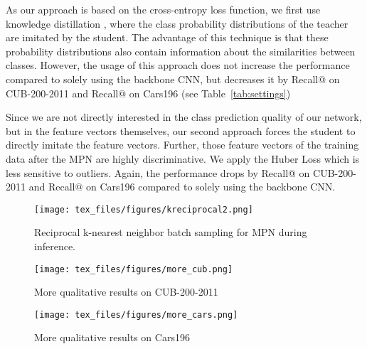 \documentclass{article}
\begin{document}
 As our approach is based on the cross-entropy loss function, we first use knowledge distillation \cite{DBLP:journals/corr/HintonVD15}, where the class probability distributions of the teacher are imitated by the student. The advantage of this technique is that these probability distributions also contain information about the similarities between classes. However, the usage of this approach does not increase the performance compared to solely using the backbone CNN, but decreases it by  Recall@ on CUB-200-2011 and  Recall@ on Cars196 (see Table~\ref{tab:settings})

 Since we are not directly interested in the class prediction quality of our network, but in the feature vectors themselves, our second approach forces the student to directly imitate the feature vectors. Further, those feature vectors of the training data after the MPN are highly discriminative. We apply the Huber Loss which is less sensitive to outliers. Again, the performance drops by  Recall@ on CUB-200-2011 and  Recall@ on Cars196 compared to solely using the backbone CNN.

\begin{figure}[t]
\begin{center}
\centerline{\texttt{[image: tex\_files/figures/kreciprocal2.png]}}
   \caption{Reciprocal k-nearest neighbor batch sampling for MPN during inference.}
   \end{center}
\label{fig:kreciprocal}
\end{figure}

\begin{figure}[ht]
    \begin{center}
    \centerline{\texttt{[image: tex\_files/figures/more\_cub.png]}}
    \caption{More qualitative results on CUB-200-2011}
    \label{fig:more_cub}
    \end{center}
\end{figure}

\begin{figure}[ht]
    \begin{center}
    \centerline{\texttt{[image: tex\_files/figures/more\_cars.png]}}
    \caption{More qualitative results on Cars196}
    \label{fig:more_cars}
    \end{center}
    \vspace{-0.5cm}
\end{figure}
\end{document}
